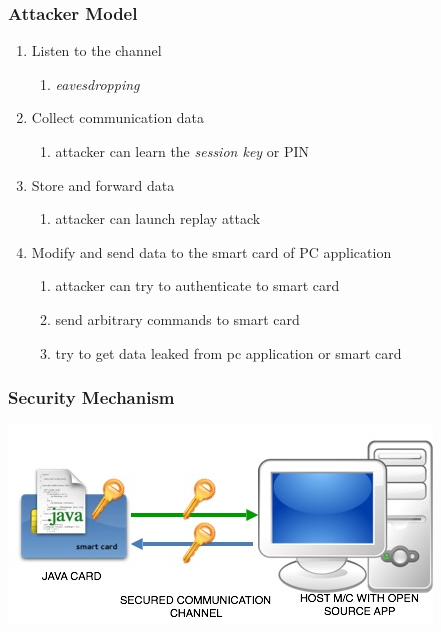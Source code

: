 \documentclass{beamer}
\begin{document}
  \begin{frame}
    \frametitle{Attacker Model}
    	\begin{enumerate}
  	\item Listen to the channel
		\begin{enumerate} [$\implies$]		\pause
			\item  \emph{eavesdropping}
		\end {enumerate}
		\pause 
 	\item Collect communication data  \pause 
		\begin{enumerate} [$\implies$]
			\item attacker can learn the \emph{session key} or PIN
		\end {enumerate}
		\pause 
	\item Store and forward data  \pause 
		\begin{enumerate} [$\implies$]
			\item  attacker can launch replay attack
		\end {enumerate}
		\pause 
	\item Modify and send data to the smart card of PC application \pause 
		\begin{enumerate} [$\implies$]
			\item  attacker can try to authenticate to smart card
			\item send arbitrary commands to smart card
			\item  try to get data leaked from pc application or smart card
		\end {enumerate}
	\end {enumerate}
  \end{frame}
  
  \begin{frame}
    \frametitle{Security Mechanism}
    	\centering
  	\includegraphics[width=\textwidth]{sample}
  \end{frame}
  
\end{document}
